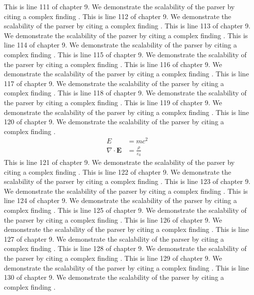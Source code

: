 This is line 111 of chapter 9. We demonstrate the scalability of the parser by citing a complex finding \cite{ref9_111}.
This is line 112 of chapter 9. We demonstrate the scalability of the parser by citing a complex finding \cite{ref9_112}.
This is line 113 of chapter 9. We demonstrate the scalability of the parser by citing a complex finding \cite{ref9_113}.
This is line 114 of chapter 9. We demonstrate the scalability of the parser by citing a complex finding \cite{ref9_114}.
This is line 115 of chapter 9. We demonstrate the scalability of the parser by citing a complex finding \cite{ref9_115}.
This is line 116 of chapter 9. We demonstrate the scalability of the parser by citing a complex finding \cite{ref9_116}.
This is line 117 of chapter 9. We demonstrate the scalability of the parser by citing a complex finding \cite{ref9_117}.
This is line 118 of chapter 9. We demonstrate the scalability of the parser by citing a complex finding \cite{ref9_118}.
This is line 119 of chapter 9. We demonstrate the scalability of the parser by citing a complex finding \cite{ref9_119}.
This is line 120 of chapter 9. We demonstrate the scalability of the parser by citing a complex finding \cite{ref9_120}.
\begin{align*}
  E &= mc^2 \\
  \nabla \cdot \mathbf{E} &= \frac{\rho}{\varepsilon_0}
\end{align*}
This is line 121 of chapter 9. We demonstrate the scalability of the parser by citing a complex finding \cite{ref9_121}.
This is line 122 of chapter 9. We demonstrate the scalability of the parser by citing a complex finding \cite{ref9_122}.
This is line 123 of chapter 9. We demonstrate the scalability of the parser by citing a complex finding \cite{ref9_123}.
This is line 124 of chapter 9. We demonstrate the scalability of the parser by citing a complex finding \cite{ref9_124}.
This is line 125 of chapter 9. We demonstrate the scalability of the parser by citing a complex finding \cite{ref9_125}.
This is line 126 of chapter 9. We demonstrate the scalability of the parser by citing a complex finding \cite{ref9_126}.
This is line 127 of chapter 9. We demonstrate the scalability of the parser by citing a complex finding \cite{ref9_127}.
This is line 128 of chapter 9. We demonstrate the scalability of the parser by citing a complex finding \cite{ref9_128}.
This is line 129 of chapter 9. We demonstrate the scalability of the parser by citing a complex finding \cite{ref9_129}.
This is line 130 of chapter 9. We demonstrate the scalability of the parser by citing a complex finding \cite{ref9_130}.
